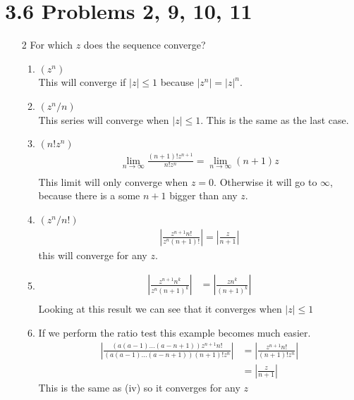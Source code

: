 \documentclass{article}
\begin{document}
  \section{3.6 Problems 2, 9, 10, 11}
  \begin{enumerate}
    \item[2] For which $z$ does the sequence converge?\\
      \begin{enumerate}[label=\roman*]
        \item $(z^n)$\\
          This will converge if $|z|\leq1$ because $|z^n|=|z|^n$.
        \item $(z^n/n)$\\
          This series will converge when $|z|\leq1$. This is the same as the last case.
        \item $(n!z^n)$\\
          \begin{align*}
            \lim_{n\to\infty}\frac{(n+1)!z^{n+1}}{n!z^n}=\lim_{n\to\infty}(n+1)z\\
          \end{align*}
          This limit will only converge when $z=0$. Otherwise it will go to $\infty$, because there is a some $n+1$ bigger than any $z$.
        \item $(z^n/n!)$\\
          \begin{align*}
            \left|\frac{z^{n+1}n!}{z^n(n+1)!}\right|=\left|\frac{z}{n+1}\right|
          \end{align*}
          this will converge for any $z$.
        \item
          \begin{align*}
            \left|\frac{z^{n+1}n^k}{z^n(n+1)^k}\right|&=\left|\frac{zn^k}{(n+1)^k}\right|\\
          \end{align*}
          Looking at this result we can see that it converges when $|z|\leq1$
        \item
          If we perform the ratio test this example becomes much easier.
          \begin{align*}
            \left|\frac{(a(a-1)...(a-n+1))z^{n+1}n!}{(a(a-1)...(a-n+1))(n+1)!z^n}\right|&=\left|\frac{z^{n+1}n!}{(n+1)!z^n}\right|\\&=\left|\frac{z}{n+1}\right|
          \end{align*}
          This is the same as (iv) so it converges for any $z$

\end{enumerate}
\end{enumerate}
\end{document}
